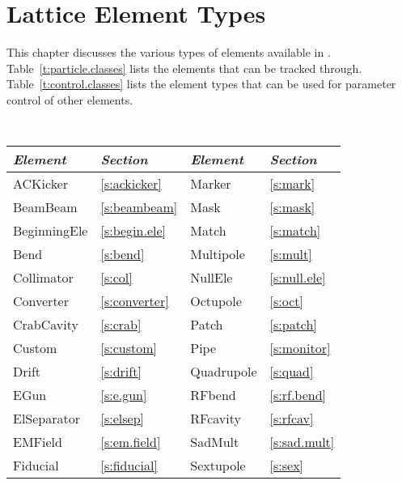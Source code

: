 \chapter{Lattice Element Types}
\label{c:ele.types}


This chapter discusses the various types of elements
available in \bmadjl.
Table~\ref{t:particle.classes} lists the elements that can be tracked through.
Table~\ref{t:control.classes} lists the  element types that can be used for parameter
control of other elements. 

\begin{table}[htb]
\centering
{\tt
\begin{tabular}{llll} \toprule
  {\it Element}    & {\it Section}         & {\it Element}      & {\it Section}       \\ \midrule
  ACKicker         & \ref{s:ackicker}      &  Marker            & \ref{s:mark}        \\
  BeamBeam         & \ref{s:beambeam}      &  Mask              & \ref{s:mask}        \\
  BeginningEle     & \ref{s:begin.ele}     &  Match             & \ref{s:match}       \\
  Bend             & \ref{s:bend}          &  Multipole         & \ref{s:mult}        \\
  Collimator       & \ref{s:col}           &  NullEle           & \ref{s:null.ele}    \\
  Converter        & \ref{s:converter}     &  Octupole          & \ref{s:oct}         \\
  CrabCavity       & \ref{s:crab}          &  Patch             & \ref{s:patch}       \\
  Custom           & \ref{s:custom}        &  Pipe              & \ref{s:monitor}     \\  
  Drift            & \ref{s:drift}         &  Quadrupole        & \ref{s:quad}        \\
  EGun             & \ref{s:e.gun}         &  RFbend            & \ref{s:rf.bend}     \\
  ElSeparator      & \ref{s:elsep}         &  RFcavity          & \ref{s:rfcav}       \\ 
  EMField          & \ref{s:em.field}      &  SadMult           & \ref{s:sad.mult}    \\
  Fiducial         & \ref{s:fiducial}      &  Sextupole         & \ref{s:sex}         \\

\end{tabular}}
\end{table}
